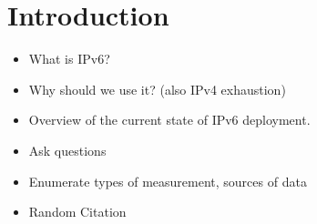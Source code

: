 \section{Introduction}

\begin{itemize}
    \item What is IPv6?
    \item Why should we use it? (also IPv4 exhaustion)
    \item Overview of the current state of IPv6 deployment.
    \item Ask questions
    \item Enumerate types of measurement, sources of data
    \item Random Citation\cite{rfc3177}
\end{itemize}
